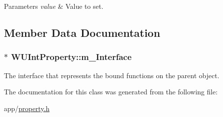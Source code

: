 \begin{DoxyParams}{Parameters}
{\em value} & Value to set. \\
\hline
\end{DoxyParams}


\subsection{Member Data Documentation}
\hypertarget{class_w_u_int_property_aef61d929eea5c2e11c3ccf7e5921f564}{
\subsubsection[{m\-\_\-\-Interface}]{$\ast$ W\-U\-Int\-Property\-::m\-\_\-\-Interface\hspace{0.3cm}{\ttfamily [protected]}}}\label{class_w_u_int_property_aef61d929eea5c2e11c3ccf7e5921f564}
The interface that represents the bound functions on the parent object. 

The documentation for this class was generated from the following file\-:\begin{DoxyCompactItemize}
\item 
app/\hyperlink{property_8h}{property.\-h}\end{DoxyCompactItemize}
